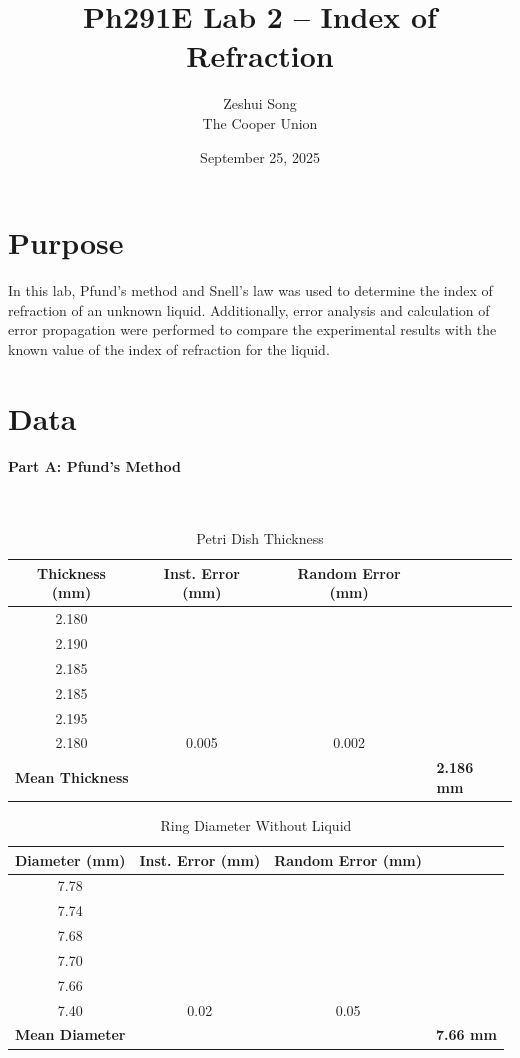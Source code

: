 \documentclass[12pt]{article}
\title{Ph291E Lab 2 -- Index of Refraction}
\author{
    Zeshui Song\\
    The Cooper Union
}
\date{September 25, 2025}
\begin{document}
\maketitle

\section{Purpose}  
In this lab, Pfund's method and Snell's law was used to determine the index of refraction of an unknown liquid. Additionally, error analysis and calculation of error propagation were performed to compare the experimental results with the known value of the index of refraction for the liquid. 

\section{Data}
\paragraph{Part A: Pfund's Method} \mbox{}\\
\begin{table}[H]
\centering
\caption{Petri Dish Thickness}
\scriptsize 
\begin{tabular}{ccccc}
\toprule
\textbf{Thickness (mm)} & \textbf{Inst. Error (mm)} & \textbf{Random Error (mm)} \\
\midrule
2.180 & & \\
2.190 & & \\
2.185 & & \\
2.185 & & \\
2.195 & & \\
2.180 & 0.005 & 0.002 \\
\midrule
\multicolumn{3}{l}{\textbf{Mean Thickness}} & \multicolumn{2}{l}{\textbf{2.186 mm}} \\
\bottomrule
\end{tabular}
\end{table}

\begin{table}[H]
\centering
\caption{Ring Diameter Without Liquid}
\scriptsize 
\begin{tabular}{ccccc}
\toprule
\textbf{Diameter (mm)} & \textbf{Inst. Error (mm)} & \textbf{Random Error (mm)} \\
\midrule
7.78 & & \\
7.74 & & \\
7.68 & & \\
7.70 & &  \\
7.66 & & \\
7.40 & 0.02 & 0.05\\
\midrule
\multicolumn{3}{l}{\textbf{Mean Diameter}} & \multicolumn{2}{l}{\textbf{7.66 mm}} \\
\bottomrule
\end{tabular}
\end{table}
\end{document}
